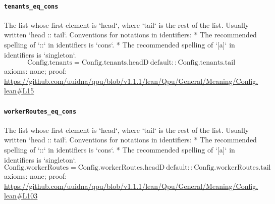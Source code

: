 \documentclass[11pt]{article}
\begin{document}
\paragraph{\texttt{tenants\_eq\_cons}}
The list whose first element is `head`, where `tail` is the rest of the list. Usually written `head :: tail`.   Conventions for notations in identifiers:   * The recommended spelling of `::` in identifiers is `cons`.   * The recommended spelling of `[a]` in identifiers is `singleton`.
\[ \mathrm{Config.tenants} = \mathrm{Config.tenants.headD}\ \mathrm{default} :: \mathrm{Config.tenants.tail} \]
\noindent axioms: none; proof: \url{https://github.com/uuidna/qpu/blob/v1.1.1/lean/Qpu/General/Meaning/Config.lean\#L15}

\paragraph{\texttt{workerRoutes\_eq\_cons}}
The list whose first element is `head`, where `tail` is the rest of the list. Usually written `head :: tail`.   Conventions for notations in identifiers:   * The recommended spelling of `::` in identifiers is `cons`.   * The recommended spelling of `[a]` in identifiers is `singleton`.
\[ \mathrm{Config.workerRoutes} = \mathrm{Config.workerRoutes.headD}\ \mathrm{default} :: \mathrm{Config.workerRoutes.tail} \]
\noindent axioms: none; proof: \url{https://github.com/uuidna/qpu/blob/v1.1.1/lean/Qpu/General/Meaning/Config.lean\#L103}
\end{document}
